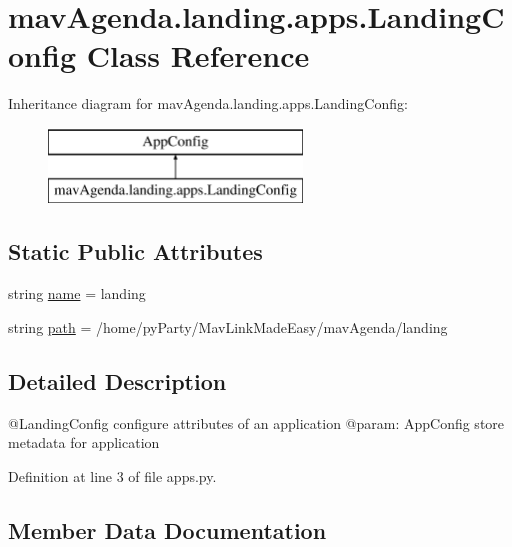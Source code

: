 \hypertarget{classmavAgenda_1_1landing_1_1apps_1_1LandingConfig}{}\section{mav\+Agenda.\+landing.\+apps.\+Landing\+Config Class Reference}
\label{classmavAgenda_1_1landing_1_1apps_1_1LandingConfig}
Inheritance diagram for mav\+Agenda.\+landing.\+apps.\+Landing\+Config\+:\begin{figure}[H]
\begin{center}
\leavevmode
\includegraphics[height=2.000000cm]{classmavAgenda_1_1landing_1_1apps_1_1LandingConfig}
\end{center}
\end{figure}
\subsection*{Static Public Attributes}
\begin{DoxyCompactItemize}
\item 
string \mbox{\hyperlink{classmavAgenda_1_1landing_1_1apps_1_1LandingConfig_ad30130e3fedb3e0edd8faae9da0a01b5}{name}} = \textquotesingle{}landing\textquotesingle{}
\item 
string \mbox{\hyperlink{classmavAgenda_1_1landing_1_1apps_1_1LandingConfig_ac01cc3fd947a1b2ffe39349d73c2019c}{path}} = \textquotesingle{}/home/py\+Party/Mav\+Link\+Made\+Easy/mav\+Agenda/landing\textquotesingle{}
\end{DoxyCompactItemize}


\subsection{Detailed Description}
\begin{DoxyVerb}@LandingConfig configure attributes of  an application
@param: AppConfig store metadata for application
\end{DoxyVerb}
 

Definition at line 3 of file apps.\+py.



\subsection{Member Data Documentation}
\mbox{\label{classmavAgenda_1_1landing_1_1apps_1_1LandingConfig_ad30130e3fedb3e0edd8faae9da0a01b5}} 
